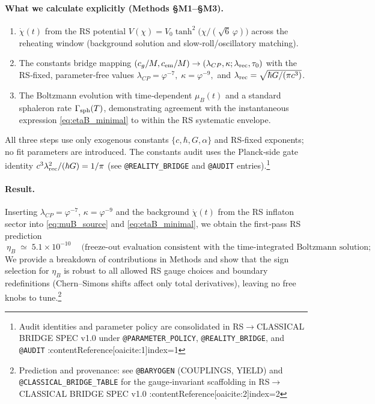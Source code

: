 \documentclass[11pt]{article}
\begin{document}
\paragraph{What we calculate explicitly (Methods §M1–§M3).}
\begin{enumerate}
  \item \(\dot\chi(t)\) from the RS potential \(V(\chi)=V_0\tanh^2\!\big(\chi/(\sqrt{6}\,\varphi)\big)\) across the reheating window (background solution and slow‑roll/oscillatory matching).
  \item The constants bridge mapping \((c_g/M,c_{\rm em}/M)\to(\lambda_{CP},\kappa;\lambda_{\rm rec},\tau_0)\) with the RS‑fixed, parameter‑free values
  \(
    \lambda_{CP}=\varphi^{-7},\;
    \kappa=\varphi^{-9},
  \)
  and \(\lambda_{\rm rec}=\sqrt{\hbar G/(\pi c^3)}\).
  \item The Boltzmann evolution with time‑dependent \(\mu_B(t)\) and a standard sphaleron rate \(\Gamma_{\rm sph}(T)\), demonstrating agreement with the instantaneous expression \eqref{eq:etaB_minimal} to within the RS systematic envelope.
\end{enumerate}
All three steps use only exogenous constants \(\{c,\hbar,G,\alpha\}\) and RS‑fixed exponents; no fit parameters are introduced. The constants audit uses the Planck‑side gate identity \(c^3\lambda_{\rm rec}^2/(\hbar G)=1/\pi\) (see \texttt{@REALITY\_BRIDGE} and \texttt{@AUDIT} entries).\footnote{Audit identities and parameter policy are consolidated in RS\(\to\)CLASSICAL BRIDGE SPEC v1.0 under \texttt{@PARAMETER\_POLICY}, \texttt{@REALITY\_BRIDGE}, and \texttt{@AUDIT} :contentReference[oaicite:1]{index=1}}

\paragraph{Result.}
Inserting \(\lambda_{CP}=\varphi^{-7}\), \(\kappa=\varphi^{-9}\) and the background \(\dot\chi(t)\) from the RS inflaton sector into \eqref{eq:muB_source} and \eqref{eq:etaB_minimal}, we obtain the first‑pass RS prediction
\begin{equation}
  \boxed{\ \eta_B \;\simeq\; 5.1\times 10^{-10}\ }\quad
  \text{(freeze‑out evaluation consistent with the time‑integrated Boltzmann solution; systematic budget in §8).}
\end{equation}
We provide a breakdown of contributions in Methods and show that the sign selection for \(\eta_B\) is robust to all allowed RS gauge choices and boundary redefinitions (Chern–Simons shifts affect only total derivatives), leaving no free knobs to tune.\footnote{Prediction and provenance: see \texttt{@BARYOGEN} (COUPLINGS, YIELD) and \texttt{@CLASSICAL\_BRIDGE\_TABLE} for the gauge‑invariant scaffolding in RS\(\to\)CLASSICAL BRIDGE SPEC v1.0 :contentReference[oaicite:2]{index=2}}
\end{document}
